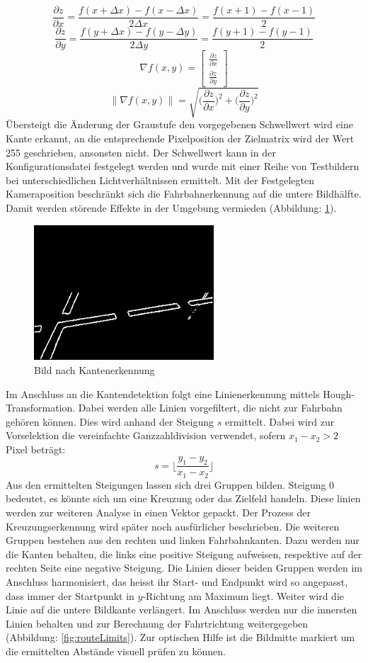 \[
\frac{\partial{z}}{\partial{x}}=\frac{f(x+\Delta{x})-f(x-\Delta{x})}{2\Delta{x}} = \frac{f(x+1)-f(x-1)}{2}
\]
\[
\frac{\partial{z}}{\partial{y}}=\frac{f(y+\Delta{x})-f(y-\Delta{y})}{2\Delta{y}} = \frac{f(y+1)-f(y-1)}{2}
\]
\[
\nabla f(x,y) = \begin{bmatrix}
\frac{\partial{z}}{\partial{x}}\\
\frac{\partial{z}}{\partial{y}}
\end{bmatrix}
\]
\[
\lVert\nabla f(x,y)\rVert = \sqrt{\Biggl(\frac{\partial{z}}{\partial{x}}\Biggr)^2 + \Biggl(\frac{\partial{z}}{\partial{y}}\Biggr)^2}
\]
Übersteigt die Änderung der Graustufe den vorgegebenen Schwellwert wird eine Kante erkannt, an die entsprechende Pixelposition der Zielmatrix wird der Wert 255 geschrieben, ansonsten nicht. Der Schwellwert kann in der Konfigurationsdatei festgelegt werden und wurde mit einer Reihe von Testbildern bei unterschiedlichen Lichtverhältnissen ermittelt. Mit der Festgelegten Kameraposition beschränkt sich die Fahrbahnerkennung auf die untere Bildhälfte. Damit werden störende Effekte in der Umgebung vermieden (Abbildung: \ref{fig:edges}). 
\begin{figure}[H]%
\centering
\includegraphics[width=0.6\textwidth]{03_Loesungskonzept/pictures/Kantengrafik.png}
\caption{Bild nach Kantenerkennung}
\label{fig:edges}
\end{figure}
Im Anschluss an die Kantendetektion folgt eine Linienerkennung mittels Hough-Transformation. Dabei werden alle Linien vorgefiltert, die nicht zur Fahrbahn gehören können. Dies wird anhand der Steigung $s$ ermittelt. Dabei wird zur Vorselektion die vereinfachte Ganzzahldivision verwendet, sofern $x_1 - x_2 > 2$ Pixel beträgt:
\[
s = \Biggl\lfloor \frac{y_1 - y_2}{x_1 - x_2} \Biggr\rfloor
\]
Aus den ermittelten Steigungen lassen sich drei Gruppen bilden. Steigung 0 bedeutet, es könnte sich um eine Kreuzung oder das Zielfeld handeln. Diese linien werden zur weiteren Analyse in einen Vektor gepackt. Der Prozess der Kreuzungserkennung wird später noch ausfürlicher beschrieben. Die weiteren Gruppen bestehen aus den rechten und linken Fahrbahnkanten. Dazu werden nur die Kanten behalten, die links eine positive Steigung aufweisen, respektive auf der rechten Seite eine negative Steigung. Die Linien dieser beiden Gruppen werden im Anschluss harmonisiert, das heisst ihr Start- und Endpunkt wird so angepasst, dass immer der Startpunkt in $y$-Richtung am Maximum liegt. Weiter wird die Linie auf die untere Bildkante verlängert. Im Anschluss werden nur die innersten Linien behalten und zur Berechnung der Fahrtrichtung weitergegeben (Abbildung: \ref{fig:routeLimits}). Zur optischen Hilfe ist die Bildmitte markiert um die ermittelten Abstände visuell prüfen zu können.
